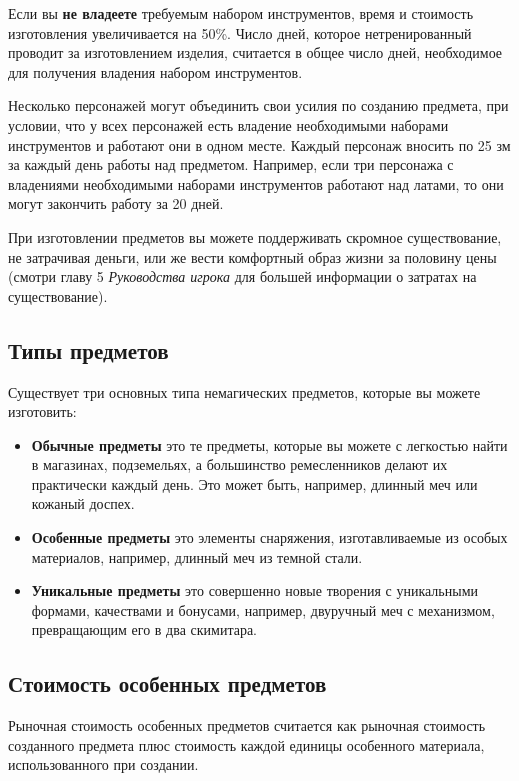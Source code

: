\documentclass[a4paper, 9pt, twocolumn]{book}
\begin{document}
	Если вы \textbf{не владеете} требуемым набором инструментов, время и стоимость изготовления увеличивается на 50\%. Число дней, которое нетренированный проводит за изготовлением изделия, считается в общее число дней, необходимое для получения владения набором инструментов.
	
	Несколько персонажей могут объединить свои усилия по созданию предмета, при условии, что у всех персонажей есть владение необходимыми наборами инструментов и работают они в одном месте. Каждый персонаж вносить по 25 зм за каждый день работы над предметом. Например, если три персонажа с владениями необходимыми наборами инструментов работают над латами, то они могут закончить работу за 20 дней.
	
	При изготовлении предметов вы можете поддерживать скромное существование, не затрачивая деньги, или же вести комфортный образ жизни за половину цены (смотри главу 5 \textit{Руководства игрока} для большей информации о затратах на существование).
	
	\subsection{Типы предметов}
	
	Существует три основных типа немагических предметов, которые вы можете изготовить:
	
	\begin{itemize}
		\item \textbf{Обычные предметы} это те предметы, которые вы можете с легкостью найти в магазинах, подземельях, а большинство ремесленников делают их практически каждый день. Это может быть, например, длинный меч или кожаный доспех.
		
		\item \textbf{Особенные предметы} это элементы снаряжения, изготавливаемые из особых материалов, например, длинный меч из темной стали.
		
		\item \textbf{Уникальные предметы} это совершенно новые творения с уникальными формами, качествами и бонусами, например, двуручный меч с механизмом, превращающим его в два скимитара.
	\end{itemize}

	\subsection{Стоимость особенных предметов}
	
	Рыночная стоимость особенных предметов считается как рыночная стоимость созданного предмета плюс стоимость  каждой единицы особенного материала, использованного при создании.
	
\end{document}

